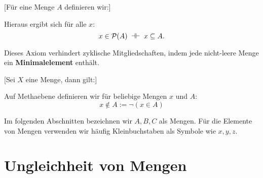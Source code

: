\documentclass[main.tex]{subfiles}
\begin{document}

[Für eine Menge \(A\) definieren wir:]
\begin{remark}
Hieraus ergibt sich für alle \(x\):
\[
x \in \mathcal{P}(A) 
\;\dashv\vdash\; 
x \subseteq A.
\]
\end{remark}



\begin{remark}
Dieses Axiom verhindert zyklische Mitgliedschaften, indem jede nicht-leere Menge ein 
\textbf{Minimalelement} enthält.    
\end{remark}


[Sei \(X\) eine Menge, dann gilt:]
\begin{remark}
Auf Methaebene definieren wir für beliebige Mengen \(x\) und \(A\): \[x\not\in A:=\neg(x\in A)\]
\end{remark}
\begin{remark}
Im folgenden Abschnitten bezeichnen wir \(A,B,C\) als Mengen. Für die Elemente von Mengen verwenden wir häufig Kleinbuchstaben als Symbole wie \(x,y,z\).
\end{remark}

\section{Ungleichheit von Mengen}
\end{document}
